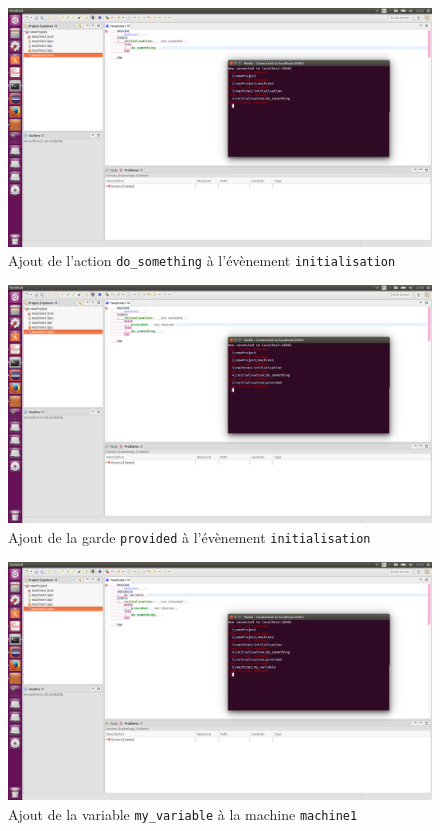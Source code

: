 \begin{figure}[H]
    \centering
    \includegraphics{pictures/rodinCommunication5.png}
    \caption{Ajout de l'action \texttt{do\_something} à l'évènement \texttt{initialisation}}
    \label{fig:rodinCommunication5}
\end{figure}

\begin{figure}[H]
    \centering
    \includegraphics{pictures/rodinCommunication6.png}
    \caption{Ajout de la garde \texttt{provided} à l'évènement \texttt{initialisation}}
    \label{fig:rodinCommunication6}
\end{figure}

\begin{figure}[H]
    \centering
    \includegraphics{pictures/rodinCommunication7.png}
    \caption{Ajout de la variable \texttt{my\_variable} à la machine \texttt{machine1}}
    \label{fig:rodinCommunication7}
\end{figure}


